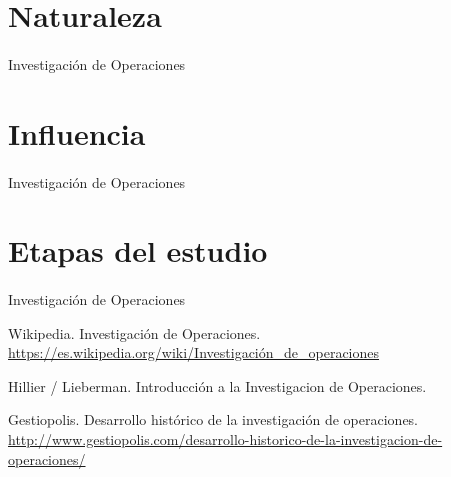 \documentclass[10pt, a4paper,spanish]{article}
\begin{document}
			
	\section{Naturaleza}
		\paragraph{}
		Investigación de Operaciones
			
	\section{Influencia}
		\paragraph{}
		Investigación de Operaciones
			
	\section{Etapas del estudio}
		\paragraph{}
		Investigación de Operaciones
					

	\begin{thebibliography}{9}
	
		Wikipedia. Investigación de Operaciones. \url{https://es.wikipedia.org/wiki/Investigación_de_operaciones}
		
		Hillier / Lieberman. Introducción a la Investigacion de Operaciones.
		
		Gestiopolis. Desarrollo histórico de la investigación de operaciones. \url{http://www.gestiopolis.com/desarrollo-historico-de-la-investigacion-de-operaciones/}

		
	\end{thebibliography}
\end{document}
